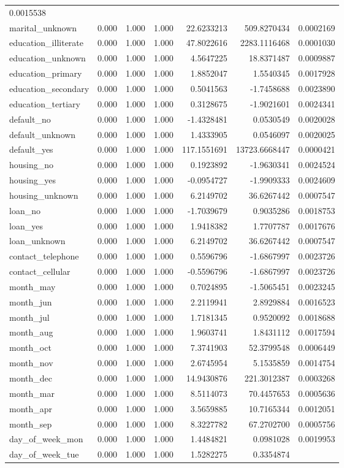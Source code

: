 \documentclass[english,man]{apa6}
\begin{document}
\begin{longtable}[c]{@{}lrrrrrr@{}}
0.0015538\tabularnewline
marital\_unknown & 0.000 & 1.000 & 1.000 & 22.6233213 & 509.8270434 &
0.0002169\tabularnewline
education\_illiterate & 0.000 & 1.000 & 1.000 & 47.8022616 &
2283.1116468 & 0.0001030\tabularnewline
education\_unknown & 0.000 & 1.000 & 1.000 & 4.5647225 & 18.8371487 &
0.0009887\tabularnewline
education\_primary & 0.000 & 1.000 & 1.000 & 1.8852047 & 1.5540345 &
0.0017928\tabularnewline
education\_secondary & 0.000 & 1.000 & 1.000 & 0.5041563 & -1.7458688 &
0.0023890\tabularnewline
education\_tertiary & 0.000 & 1.000 & 1.000 & 0.3128675 & -1.9021601 &
0.0024341\tabularnewline
default\_no & 0.000 & 1.000 & 1.000 & -1.4328481 & 0.0530549 &
0.0020028\tabularnewline
default\_unknown & 0.000 & 1.000 & 1.000 & 1.4333905 & 0.0546097 &
0.0020025\tabularnewline
default\_yes & 0.000 & 1.000 & 1.000 & 117.1551691 & 13723.6668447 &
0.0000421\tabularnewline
housing\_no & 0.000 & 1.000 & 1.000 & 0.1923892 & -1.9630341 &
0.0024524\tabularnewline
housing\_yes & 0.000 & 1.000 & 1.000 & -0.0954727 & -1.9909333 &
0.0024609\tabularnewline
housing\_unknown & 0.000 & 1.000 & 1.000 & 6.2149702 & 36.6267442 &
0.0007547\tabularnewline
loan\_no & 0.000 & 1.000 & 1.000 & -1.7039679 & 0.9035286 &
0.0018753\tabularnewline
loan\_yes & 0.000 & 1.000 & 1.000 & 1.9418382 & 1.7707787 &
0.0017676\tabularnewline
loan\_unknown & 0.000 & 1.000 & 1.000 & 6.2149702 & 36.6267442 &
0.0007547\tabularnewline
contact\_telephone & 0.000 & 1.000 & 1.000 & 0.5596796 & -1.6867997 &
0.0023726\tabularnewline
contact\_cellular & 0.000 & 1.000 & 1.000 & -0.5596796 & -1.6867997 &
0.0023726\tabularnewline
month\_may & 0.000 & 1.000 & 1.000 & 0.7024895 & -1.5065451 &
0.0023245\tabularnewline
month\_jun & 0.000 & 1.000 & 1.000 & 2.2119941 & 2.8929884 &
0.0016523\tabularnewline
month\_jul & 0.000 & 1.000 & 1.000 & 1.7181345 & 0.9520092 &
0.0018688\tabularnewline
month\_aug & 0.000 & 1.000 & 1.000 & 1.9603741 & 1.8431112 &
0.0017594\tabularnewline
month\_oct & 0.000 & 1.000 & 1.000 & 7.3741903 & 52.3799548 &
0.0006449\tabularnewline
month\_nov & 0.000 & 1.000 & 1.000 & 2.6745954 & 5.1535859 &
0.0014754\tabularnewline
month\_dec & 0.000 & 1.000 & 1.000 & 14.9430876 & 221.3012387 &
0.0003268\tabularnewline
month\_mar & 0.000 & 1.000 & 1.000 & 8.5114073 & 70.4457653 &
0.0005636\tabularnewline
month\_apr & 0.000 & 1.000 & 1.000 & 3.5659885 & 10.7165344 &
0.0012051\tabularnewline
month\_sep & 0.000 & 1.000 & 1.000 & 8.3227782 & 67.2702700 &
0.0005756\tabularnewline
day\_of\_week\_mon & 0.000 & 1.000 & 1.000 & 1.4484821 & 0.0981028 &
0.0019953\tabularnewline
day\_of\_week\_tue & 0.000 & 1.000 & 1.000 & 1.5282275 & 0.3354874 &

\end{longtable}
\end{document}
